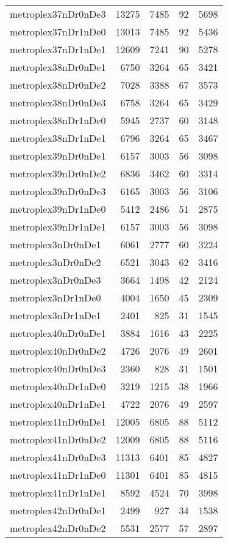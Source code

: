 \documentclass[../../../thesis.tex]{subfiles}
\begin{document}
\begin{longtable}{lrrrr}
metroplex37nDr0nDe3 & 13275 & 7485 & 92 & 5698 \\
metroplex37nDr1nDe0 & 13013 & 7485 & 92 & 5436 \\
metroplex37nDr1nDe1 & 12609 & 7241 & 90 & 5278 \\
metroplex38nDr0nDe1 & 6750 & 3264 & 65 & 3421 \\
metroplex38nDr0nDe2 & 7028 & 3388 & 67 & 3573 \\
metroplex38nDr0nDe3 & 6758 & 3264 & 65 & 3429 \\
metroplex38nDr1nDe0 & 5945 & 2737 & 60 & 3148 \\
metroplex38nDr1nDe1 & 6796 & 3264 & 65 & 3467 \\
metroplex39nDr0nDe1 & 6157 & 3003 & 56 & 3098 \\
metroplex39nDr0nDe2 & 6836 & 3462 & 60 & 3314 \\
metroplex39nDr0nDe3 & 6165 & 3003 & 56 & 3106 \\
metroplex39nDr1nDe0 & 5412 & 2486 & 51 & 2875 \\
metroplex39nDr1nDe1 & 6157 & 3003 & 56 & 3098 \\
metroplex3nDr0nDe1 & 6061 & 2777 & 60 & 3224 \\
metroplex3nDr0nDe2 & 6521 & 3043 & 62 & 3416 \\
metroplex3nDr0nDe3 & 3664 & 1498 & 42 & 2124 \\
metroplex3nDr1nDe0 & 4004 & 1650 & 45 & 2309 \\
metroplex3nDr1nDe1 & 2401 & 825 & 31 & 1545 \\
metroplex40nDr0nDe1 & 3884 & 1616 & 43 & 2225 \\
metroplex40nDr0nDe2 & 4726 & 2076 & 49 & 2601 \\
metroplex40nDr0nDe3 & 2360 & 828 & 31 & 1501 \\
metroplex40nDr1nDe0 & 3219 & 1215 & 38 & 1966 \\
metroplex40nDr1nDe1 & 4722 & 2076 & 49 & 2597 \\
metroplex41nDr0nDe1 & 12005 & 6805 & 88 & 5112 \\
metroplex41nDr0nDe2 & 12009 & 6805 & 88 & 5116 \\
metroplex41nDr0nDe3 & 11313 & 6401 & 85 & 4827 \\
metroplex41nDr1nDe0 & 11301 & 6401 & 85 & 4815 \\
metroplex41nDr1nDe1 & 8592 & 4524 & 70 & 3998 \\
metroplex42nDr0nDe1 & 2499 & 927 & 34 & 1538 \\
metroplex42nDr0nDe2 & 5531 & 2577 & 57 & 2897 \\

\end{longtable}
\end{document}
